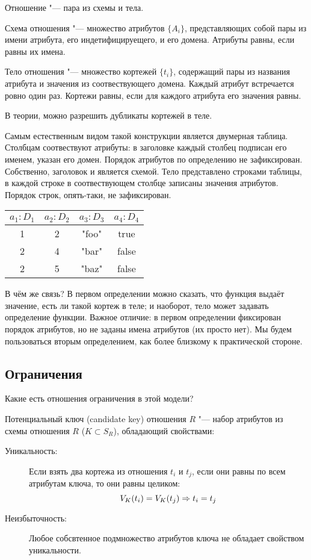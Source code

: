 \begin{Def}
	Отношение "--- пара из схемы и тела.

	Схема отношения "--- множество атрибутов $\{A_i\}$, представляющих собой пары из имени атрибута, его индетифицируещего, и его домена.
	Атрибуты равны, если равны их имена.

	Тело отношения "--- множество кортежей $\{t_i\}$, содержащий пары из названия атрибута и значения из соотвествующего домена.
	Каждый атрибут встречается ровно один раз.
	Кортежи равны, если для каждого атрибута его значения равны.
\end{Def}
\begin{Rem}
	В теории, можно разрешить дубликаты кортежей в теле.
\end{Rem}
Самым естественным видом такой конструкции является двумерная таблица.
Столбцам соотвествуют атрибуты: в заголовке каждый столбец подписан его именем, указан его домен.
Порядок атрибутов по определению не зафиксирован. Собственно, заголовок и является схемой.
Тело представлено строками таблицы, в каждой строке в соотвествующем столбце записаны значения атрибутов.
Порядок строк, опять-таки, не зафиксирован.
\begin{center}\tt\begin{tabular}{|c|c|c|c|}
\hline
$a_1: D_1$ & $a_2: D_2$ & $a_3: D_3$ & $a_4: D_4$ \\
\hline
1 & 2 & "foo" & true \\
2 & 4 & "bar" & false \\
2 & 5 & "baz" & false \\
\hline
\end{tabular}\end{center}

В чём же связь?
В первом определении можно сказать, что функция выдаёт значение, есть ли такой кортеж в теле; и наоборот, тело может задавать определение функции.
Важное отличие: в первом определении фиксирован порядок атрибутов, но не заданы имена атрибутов (их просто нет).
Мы будем пользоваться вторым определением, как более близкому к практической стороне.

\subsection{Ограничения}

Какие есть отношения ограничения в этой модели?
\begin{Def}
	Потенциальный ключ (candidate key) отношения $R$ "--- набор атрибутов из схемы отношения $R$ ($K \subset S_R$), обладающий свойствами:
	\begin{description}
	\item[Уникальность:]
		Если взять два кортежа из отношения $t_i$ и $t_j$, если они равны по всем атрибутам ключа, то они равны целиком:
		\[ V_K(t_i) = V_K(t_j) \Rightarrow t_i = t_j \]
	\item[Неизбыточность:]
		Любое собсвтенное подмножество атрибутов ключа не обладает свойством уникальности.
	\end{description}
\end{Def}

